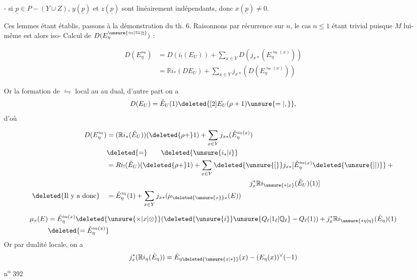 - si $\underline{p}\in P-(Y\cup Z)$, $y(\underline{p})$ et $z(\underline{p})$ sont linéairement indépendants, donc $x(\underline{p})\ne 0$.

Ces lemmes étant établis, passons à la démonstration du th. 6. Raisonnons par récurrence sur $n$, le cas $n\leq 1$ étant trivial puisque $M$ lui-même est alors iso-
Calcul de $D(E_\eta^{\unsure{\leftrightharpoons|\leftrightarrows|\natural}})$ :

\[
\begin{aligned}
D(E_\eta^{\leftrightharpoons}) &= D(i_!(E_U))+\sum_{x\in Y}D(j_{x*}(E_\eta^{\leftrightharpoons(x)}))\\
&=\mathbb R i_*(D E_U)+\sum_{x\in Y}j_{x*}(D(E_\eta^{\leftrightharpoons(x)}))
\end{aligned}
\]

Or la formation de $\leftrightharpoons$ local  au  au dual, d'autre part on a
\[
D(E_U)=\check E_U(1)\deleted{[2]E_U(\rho+1)\unsure{=|,}},
\]
d'où

\[
\begin{aligned}
D(E_\eta^{\leftrightharpoons})&=(\mathbb R i_*(\check E_U))(\deleted{\rho+}1)+\sum_{x\in Y}j_{x*}(\check E_\eta^{\leftrightharpoons(x)})\\
&\deleted{=}\qquad\deleted{\unsure{i_*|i}}\\
&=R i_!(\check E_U)(\deleted{\rho+}1)+\sum_{x\in Y}\deleted{\unsure{[}}j_{x*}[\check E_\eta^{\leftrightharpoons(x)}\deleted{\unsure{]|)}}+{}\\
&\hspace{21em}j_x^*\mathbb R i_{\unsure{*|x}}(\check E_U)(1)]\\
\text{\deleted{Il y a donc}}\quad &=\check E_\eta^{\leftrightharpoons}(1)+\sum_{x\in Y}j_{x*}(\mu_{\deleted{\unsure{x}}x}(E))
\end{aligned}
\]

\[
\begin{aligned}
\mu_x(E)&=\check E_\eta^{\leftrightharpoons(x)}\deleted{\unsure{\times|x|\otimes}}(\deleted{\unsure{i}}\unsure{Q_\ell|1_\ell|\mathbb{Q}_\ell}-Q_\ell(1))+j_x^*\mathbb R i_{\unsure{*\eta|\eta}}(\check E_\eta)(1)\\
&\deleted{=\check E_\eta^{\leftrightharpoons(x)}}
\end{aligned}
\]
Or  par dualité locale, on a
\[
j_x^*(\mathbb R i_\eta(\check E_\eta))=\check E_{\eta\deleted{\unsure{x|*}}}(x)-(E_\eta(x))^\vee(-1)
\]
n\textsuperscript{o} 392

